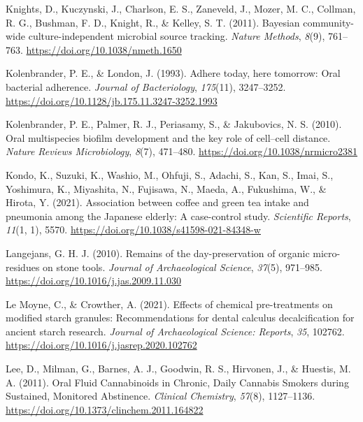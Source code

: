 \documentclass[
  letterpaper,
]{book}
\newlength{\cslhangindent}
\newlength{\cslentryspacingunit} %
\newenvironment{CSLReferences}[2] %
 {%
  \setlength{\parindent}{0pt}
  \ifodd #1
  \let\oldpar\par
  \def\par{\hangindent=\cslhangindent\oldpar}
  \fi
  \setlength{\parskip}{#2\cslentryspacingunit}
 }%
 {}
\begin{document}
\begin{CSLReferences}{1}{0}
\leavevmode{}%
Knights, D., Kuczynski, J., Charlson, E. S., Zaneveld, J., Mozer, M. C.,
Collman, R. G., Bushman, F. D., Knight, R., \& Kelley, S. T. (2011).
Bayesian community-wide culture-independent microbial source tracking.
\emph{Nature Methods}, \emph{8}(9), 761--763.
\url{https://doi.org/10.1038/nmeth.1650}

\leavevmode{}%
Kolenbrander, P. E., \& London, J. (1993). Adhere today, here tomorrow:
Oral bacterial adherence. \emph{Journal of Bacteriology},
\emph{175}(11), 3247--3252.
\url{https://doi.org/10.1128/jb.175.11.3247-3252.1993}

\leavevmode{}%
Kolenbrander, P. E., Palmer, R. J., Periasamy, S., \& Jakubovics, N. S.
(2010). Oral multispecies biofilm development and the key role of
cell--cell distance. \emph{Nature Reviews Microbiology}, \emph{8}(7),
471--480. \url{https://doi.org/10.1038/nrmicro2381}

\leavevmode{}%
Kondo, K., Suzuki, K., Washio, M., Ohfuji, S., Adachi, S., Kan, S.,
Imai, S., Yoshimura, K., Miyashita, N., Fujisawa, N., Maeda, A.,
Fukushima, W., \& Hirota, Y. (2021). Association between coffee and
green tea intake and pneumonia among the {Japanese} elderly: A
case-control study. \emph{Scientific Reports}, \emph{11}(1, 1), 5570.
\url{https://doi.org/10.1038/s41598-021-84348-w}

\leavevmode{}%
Langejans, G. H. J. (2010). Remains of the day-preservation of organic
micro-residues on stone tools. \emph{Journal of Archaeological Science},
\emph{37}(5), 971--985. \url{https://doi.org/10.1016/j.jas.2009.11.030}

\leavevmode{}%
Le Moyne, C., \& Crowther, A. (2021). Effects of chemical pre-treatments
on modified starch granules: {Recommendations} for dental calculus
decalcification for ancient starch research. \emph{Journal of
Archaeological Science: Reports}, \emph{35}, 102762.
\url{https://doi.org/10.1016/j.jasrep.2020.102762}

\leavevmode{}%
Lee, D., Milman, G., Barnes, A. J., Goodwin, R. S., Hirvonen, J., \&
Huestis, M. A. (2011). Oral {Fluid Cannabinoids} in {Chronic}, {Daily
Cannabis Smokers} during {Sustained}, {Monitored Abstinence}.
\emph{Clinical Chemistry}, \emph{57}(8), 1127--1136.
\url{https://doi.org/10.1373/clinchem.2011.164822}


\end{CSLReferences}
\end{document}
